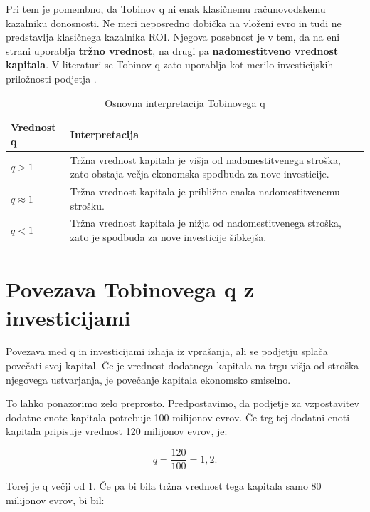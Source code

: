 \documentclass[12pt,a4paper]{article}
\begin{document}
Pri tem je pomembno, da Tobinov q ni enak klasičnemu računovodskemu kazalniku donosnosti. Ne meri neposredno dobička na vloženi evro in tudi ne predstavlja klasičnega kazalnika ROI. Njegova posebnost je v tem, da na eni strani uporablja \textbf{tržno vrednost}, na drugi pa \textbf{nadomestitveno vrednost kapitala}. V literaturi se Tobinov q zato uporablja kot merilo investicijskih priložnosti podjetja \citep{PetersTaylor2016}.

\begin{table}[htbp]
\centering
\caption{Osnovna interpretacija Tobinovega q}
\label{tab:interpretacija_q}
\begin{tabular}{p{3cm}p{10cm}}
\toprule
\textbf{Vrednost q} & \textbf{Interpretacija} \\
\midrule
$q>1$ &
Tržna vrednost kapitala je višja od nadomestitvenega stroška, zato obstaja večja ekonomska spodbuda za nove investicije. \\

$q\approx1$ &
Tržna vrednost kapitala je približno enaka nadomestitvenemu strošku. \\

$q<1$ &
Tržna vrednost kapitala je nižja od nadomestitvenega stroška, zato je spodbuda za nove investicije šibkejša. \\
\bottomrule
\end{tabular}
\end{table}


\section{Povezava Tobinovega q z investicijami}

Povezava med q in investicijami izhaja iz vprašanja, ali se podjetju splača povečati svoj kapital. Če je vrednost dodatnega kapitala na trgu višja od stroška njegovega ustvarjanja, je povečanje kapitala ekonomsko smiselno.

To lahko ponazorimo zelo preprosto. Predpostavimo, da podjetje za vzpostavitev dodatne enote kapitala potrebuje 100 milijonov evrov. Če trg tej dodatni enoti kapitala pripisuje vrednost 120 milijonov evrov, je:

\begin{equation}
q=\frac{120}{100}=1,2.
\end{equation}

Torej je q večji od 1. Če pa bi bila tržna vrednost tega kapitala samo 80 milijonov evrov, bi bil:
\end{document}
